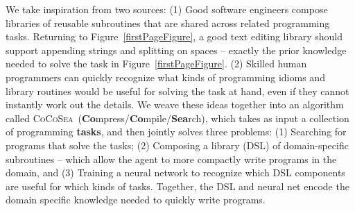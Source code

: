 \documentclass{article}
\newcommand{\system}{\textsc{CoCoSea}~}
\begin{document}
We take inspiration from two sources:
(1) Good software engineers compose libraries
of reusable subroutines
that are shared across
related programming tasks.
Returning to Figure~\ref{firstPageFigure},
a good text editing library should support appending strings and splitting on spaces --
exactly the prior knowledge needed to solve the task in Figure~\ref{firstPageFigure}.
(2) Skilled human programmers
can quickly recognize what kinds of programming idioms and library routines would be useful for solving
the task at hand, even if they cannot instantly work out the details.
We weave these ideas together into
an algorithm called \system (\textbf{Co}mpress/\textbf{Co}mpile/\textbf{Sea}rch),
which takes as input a collection of
programming \textbf{tasks},
and then jointly
solves three problems:
(1) Searching for programs that solve the tasks;
(2) Composing a library (DSL) of
domain-specific
subroutines -- which allow the agent to
more compactly write programs in the domain,
and (3) Training a neural network
to recognize
which DSL components are
useful for which kinds of tasks.
Together, the DSL and neural net
encode the domain specific knowledge needed to
quickly write programs.



\end{document}
